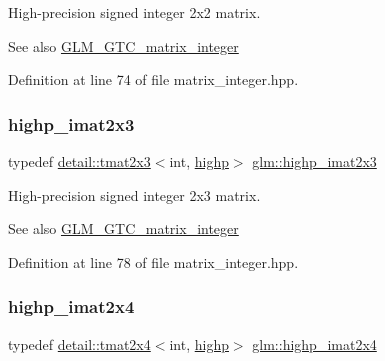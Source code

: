 High-\/precision signed integer 2x2 matrix. \begin{DoxySeeAlso}{See also}
\hyperlink{group__gtc__matrix__integer}{G\+L\+M\+\_\+\+G\+T\+C\+\_\+matrix\+\_\+integer} 
\end{DoxySeeAlso}


Definition at line 74 of file matrix\+\_\+integer.\+hpp.

\mbox{\label{group__gtc__matrix__integer_ga7b7079ab95ac8f533ac565fcf1341c76}} 
\subsubsection{\texorpdfstring{highp\+\_\+imat2x3}{highp\_imat2x3}}
{\footnotesize\ttfamily typedef \hyperlink{structglm_1_1detail_1_1tmat2x3}{detail\+::tmat2x3}$<$int, \hyperlink{namespaceglm_a0f04f086094c747d227af4425893f545ac6f7eab42eacbb10d59a58e95e362074}{highp}$>$ \hyperlink{group__gtc__matrix__integer_ga7b7079ab95ac8f533ac565fcf1341c76}{glm\+::highp\+\_\+imat2x3}}

High-\/precision signed integer 2x3 matrix. \begin{DoxySeeAlso}{See also}
\hyperlink{group__gtc__matrix__integer}{G\+L\+M\+\_\+\+G\+T\+C\+\_\+matrix\+\_\+integer} 
\end{DoxySeeAlso}


Definition at line 78 of file matrix\+\_\+integer.\+hpp.

\mbox{\label{group__gtc__matrix__integer_ga84aec2e744ecac589fe8d502266e8efc}} 
\subsubsection{\texorpdfstring{highp\+\_\+imat2x4}{highp\_imat2x4}}
{\footnotesize\ttfamily typedef \hyperlink{structglm_1_1detail_1_1tmat2x4}{detail\+::tmat2x4}$<$int, \hyperlink{namespaceglm_a0f04f086094c747d227af4425893f545ac6f7eab42eacbb10d59a58e95e362074}{highp}$>$ \hyperlink{group__gtc__matrix__integer_ga84aec2e744ecac589fe8d502266e8efc}{glm\+::highp\+\_\+imat2x4}}

